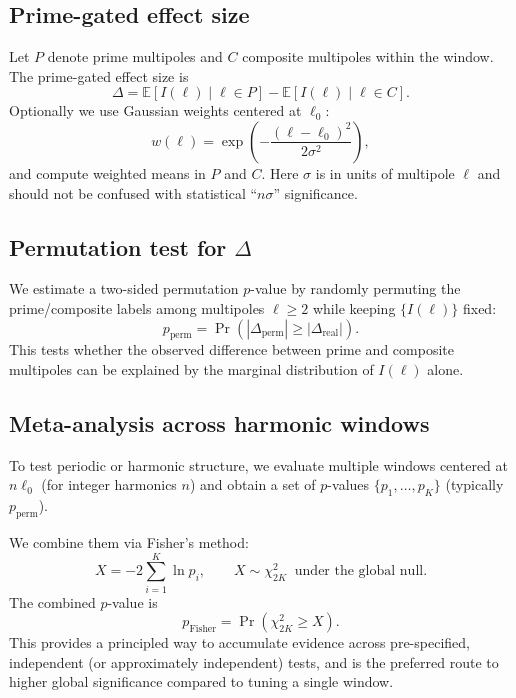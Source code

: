 \subsection{Prime-gated effect size}
Let $P$ denote prime multipoles and $C$ composite multipoles within the window.
The prime-gated effect size is
\begin{equation}
\Delta = \mathbb{E}[I(\ell)\mid \ell\in P] - \mathbb{E}[I(\ell)\mid \ell\in C].
\end{equation}
Optionally we use Gaussian weights centered at $\ell_0$:
\begin{equation}
w(\ell)=\exp\!\left(-\frac{(\ell-\ell_0)^2}{2\sigma^2}\right),
\end{equation}
and compute weighted means in $P$ and $C$. Here $\sigma$ is in units of multipole $\ell$
and should not be confused with statistical ``$n\sigma$'' significance.

\subsection{Permutation test for $\Delta$}
We estimate a two-sided permutation $p$-value by randomly permuting the prime/composite
labels among multipoles $\ell\ge2$ while keeping $\{I(\ell)\}$ fixed:
\begin{equation}
p_{\mathrm{perm}} = \Pr\left(|\Delta_{\mathrm{perm}}|\ge|\Delta_{\mathrm{real}}|\right).
\end{equation}
This tests whether the observed difference between prime and composite multipoles
can be explained by the marginal distribution of $I(\ell)$ alone.

\subsection{Meta-analysis across harmonic windows}
To test periodic or harmonic structure, we evaluate multiple windows centered at
$n\ell_0$ (for integer harmonics $n$) and obtain a set of $p$-values
$\{p_1,\dots,p_K\}$ (typically $p_{\mathrm{perm}}$).

We combine them via Fisher's method:
\begin{equation}
X = -2\sum_{i=1}^K \ln p_i,\qquad X \sim \chi^2_{2K} \;\; \text{under the global null}.
\end{equation}
The combined $p$-value is
\begin{equation}
p_{\mathrm{Fisher}} = \Pr(\chi^2_{2K}\ge X).
\end{equation}
This provides a principled way to accumulate evidence across pre-specified, independent
(or approximately independent) tests, and is the preferred route to higher global
significance compared to tuning a single window.

